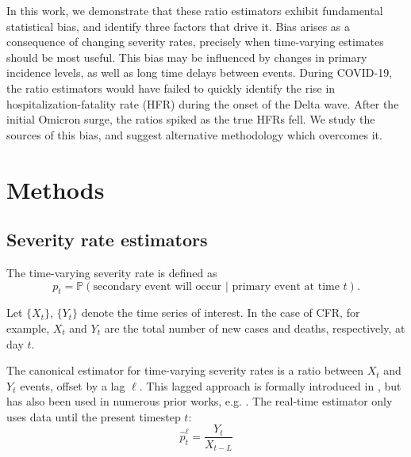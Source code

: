\documentclass{article}
\begin{document}
In this work, we demonstrate that these ratio estimators exhibit fundamental statistical bias, and identify three factors that drive it. Bias arises as a consequence of changing severity rates, precisely when time-varying estimates should be most useful. This bias may be influenced by changes in primary incidence levels, as well as long time delays between events. During COVID-19, the ratio estimators would have failed to quickly identify the rise in hospitalization-fatality rate (HFR) during the onset of the Delta wave. After the initial Omicron surge, the ratios spiked as the true HFRs fell. We study the sources of this bias, and suggest alternative methodology which overcomes it.


\section{Methods}
\subsection{Severity rate estimators}

The time-varying severity rate is defined as
\begin{equation}\label{eq:severity}
    p_t = \mathbb{P}(\text{secondary event will occur } \vert \text{ primary event at time }t).
\end{equation}

Let $\{X_t\}$, $\{Y_t\}$ denote the time series of interest. In the case of CFR, for example, $X_t$ and $Y_t$ are the total number of new cases and deaths, respectively, at day $t$. 

The canonical estimator for time-varying severity rates is a ratio between $X_t$ and $Y_t$ events, offset by a lag $\ell$. This lagged approach is formally introduced in \citet{thomas2021estimating}, but has also been used in numerous prior works, e.g. \citep{germany,horita2022global,timevar_ifr,yuan2020monitoring,LIU2023100350,atlantic,wsj}. The real-time estimator only uses data until the present timestep $t$: 
\begin{equation}\label{eq:lagged}
    \hat{p}_t^\ell = \frac{Y_t}{X_{t-L}}
\end{equation}
\end{document}
